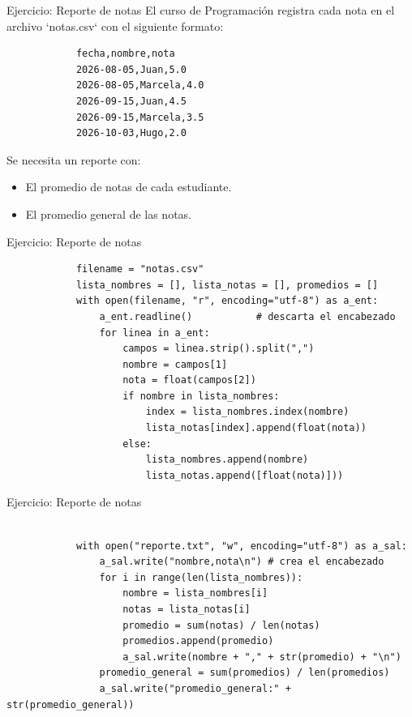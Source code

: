 \documentclass{beamer}
\begin{document}
    \begin{frame}[fragile, t]{Ejercicio: Reporte de notas}
        El curso de Programación registra cada nota en el archivo `notas.csv` con el siguiente formato:
        \begin{verbatim}
            fecha,nombre,nota
            2026-08-05,Juan,5.0
            2026-08-05,Marcela,4.0
            2026-09-15,Juan,4.5
            2026-09-15,Marcela,3.5
            2026-10-03,Hugo,2.0
        \end{verbatim}
        Se necesita un reporte con: 
        \begin{itemize}
            \item El promedio de notas de cada estudiante.
            \item El promedio general de las notas.
        \end{itemize}
    \end{frame}

    \begin{frame}[fragile, t]{Ejercicio: Reporte de notas}
        \begin{verbatim}
            filename = "notas.csv"
            lista_nombres = [], lista_notas = [], promedios = []
            with open(filename, "r", encoding="utf-8") as a_ent:
                a_ent.readline()           # descarta el encabezado
                for linea in a_ent:
                    campos = linea.strip().split(",")
                    nombre = campos[1]
                    nota = float(campos[2])
                    if nombre in lista_nombres:
                        index = lista_nombres.index(nombre)
                        lista_notas[index].append(float(nota))
                    else:
                        lista_nombres.append(nombre)
                        lista_notas.append([float(nota)]))
        \end{verbatim}
    \end{frame}

    \begin{frame}[fragile, t]{Ejercicio: Reporte de notas}
        \begin{verbatim}

            with open("reporte.txt", "w", encoding="utf-8") as a_sal:
                a_sal.write("nombre,nota\n") # crea el encabezado
                for i in range(len(lista_nombres)):
                    nombre = lista_nombres[i]
                    notas = lista_notas[i]
                    promedio = sum(notas) / len(notas)
                    promedios.append(promedio)
                    a_sal.write(nombre + "," + str(promedio) + "\n")
                promedio_general = sum(promedios) / len(promedios)
                a_sal.write("promedio_general:" + str(promedio_general))
        \end{verbatim}
    \end{frame}
\end{document}
